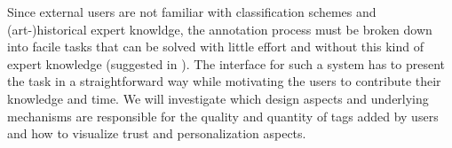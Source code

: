 Since external users are not familiar with classification schemes and (art-)historical expert knowldge, the annotation process must be broken down into facile tasks that can be solved with little effort and without this kind of expert knowledge (suggested in \cite{He2013}).
The interface for such a system has to present the task in a straightforward way while motivating the users to contribute their knowledge and time. We will investigate which design aspects and underlying mechanisms are responsible for the quality and quantity of tags added by users and how to visualize trust and personalization aspects.

